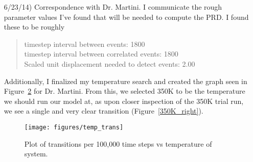 \documentclass[12pt]{article}
\begin{document}
\begin{itemize}
\begin{quote}
So, in the process of trying all of this I realized I had been before keeping the block completely rigid (I was not heating it as I had thought), which besides having to have two atoms on the surface and being completely physically unbelievable, gave results about what we were expecting.  My question though is, if this is just a toy model to go about asking a more difficult question, why must it be physically real?  If all we want to do is create a system that has "rare" transition events and can be spatially parallized, then keeping the surface completely rigid might not be so bad.
\end{quote}

In her response, she reminds me of the fix setforce command, which can be used to zero out the velocity of certain atoms.  Doing this to a bottom layer will keep the block from rotating and simulate the block as a member of a bulk piece of gold.  This turns out to fix most of the problems I was having with melting as well.  Doing an initial test of this new system at 300K generated the plot in Figure~\ref{300K_wrong}.

\begin{figure}
\begin{center}
 \texttt{[image: figures/300K\_transition]}
 \caption{The squared displacement of a single atom while atom and entire block are heated to 300K.}
 \label{300K_wrong}
 \end{center}
\end{figure}


\item[6/23/14)] Correspondence with Dr. Martini.  I communicate the rough parameter values I've found that will be needed to compute the PRD.  I found these to be roughly

\begin{quote}
timestep interval between events: 1800 \hfill \\
timestep interval between correlated events: 1800 \hfill \\
Scaled unit displacement needed to detect events: 2.00 \hfill
\end{quote}

Additionally, I finalized my temperature search and created the graph seen in Figure~\ref{temp_trans} for Dr. Martini.  From this, we selected 350K to be the temperature we should run our model at, as upon closer inspection of the 350K trial run, we see a single and very clear transition (Figure~\ref{350K_right}).  

\begin{figure}
\begin{center}
 \texttt{[image: figures/temp\_trans]}
 \caption{Plot of transitions per 100,000 time steps vs temperature of system.}
 \label{temp_trans}
 \end{center}
\end{figure}


\end{itemize}
\end{document}
